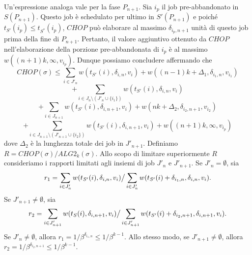 \documentclass[12pt]{article}
\begin{document}
Un'espressione analoga vale per la fase $P_{n + 1}$. Sia $i_{p}$ il job pre-abbandonato in $S(P_{n + 1})$. Questo job è schedulato per ultimo in $S'(P_{n + 1})$ e poiché $t_{S'}(i_{p}) \leq t_{S^{*}} (i_{p})$, $CHOP$ può elaborare al massimo $\delta_{i_{p}, n+1}$ unità di questo job prima della fine di $P_{n + 1}$. Pertanto, il valore aggiuntivo ottenuto da $CHOP$ nell'elaborazione della porzione pre-abbandonata di $i_{p}$ è al massimo $w ((n + 1) k, \infty,v_{i_{p}}).$ Dunque possiamo concludere affermando che
\begin{equation}
CHOP(\sigma) \leq \sum_{i \in J'_{n}} w (t_{S'}(i), \delta_{i,n},v_{i}) + w ((n - 1) k + \Delta_{1}, \delta_{i_{1},n}, v_{i_{1}}) \tag*{(6)}
\end{equation}
$$+ \sum_{i\in J_{n} \setminus (J'_{n}\cup \{i_{1}\})} w(t_{S'}(i), \delta_{i,n},v_{i})$$
\begin{equation}
+ \sum_{i \in J_{n+1}}w (t_{S'} (i), \delta_{i,n + 1},v_{i}) + w (nk + \Delta_{2}, \delta_{i_{2}, n+1}, v_{i_{2}})\tag*{(7)}
\end{equation}
\begin{equation}
+ \sum_{i \in J_{n+1} \setminus (J'_{n+1} \cup \{i_{2}\})} w (t_{S'} (i), \delta_{i,n+1}, v_{i}) + w ((n + 1) k, \infty, v_{i_{p}}) \tag*{(8)}
\end{equation}
dove $\Delta_{2}$ è la lunghezza totale dei job in $J'_{n+1}$. Definiamo $R = CHOP(\sigma) / ALG2_{k} (\sigma).$ Allo scopo di limitare superiormente $R$ consideriamo i rapporti limitati agli insiemi di job $J'_{n}$ e $J'_{n+1}$. Se $J'_{n} = \emptyset$, sia
$$r_{1} = \sum_{i\in J'_{n}} w(t_{S'}(i), \delta_{i,n}, v_{i}) \big{/} \sum_{i \in J'_{n}} w (t_{S'}(i) + \delta_{i_{1},n}, \delta_{i,n}, v_{i}).$$
Se $J'_{n+1} \neq \emptyset$, sia
$$r_{2} = \sum_{i \in J'_{n+1}} w (t_{S} (i), \delta_{i,n+1}, v_{i}) \big{/} \sum_{i \in J'_{n+1}} w (t_{S'} (i) + \delta_{i_{2}, n+1}, \delta_{i,n+1}, v_{i}).$$
Se $J'_{n} \neq \emptyset$, allora $r_{1} = 1 / \beta^{\delta_{i_{1},n}} \leq 1 / \beta^{k-1}$. Allo stesso modo, se $J'_{n+1} \neq \emptyset$, allora $r_{2} = 1 / \beta^{\delta_{i_{2}, n+1}} \leq 1 / \beta^{k-1}$.
\end{document}
